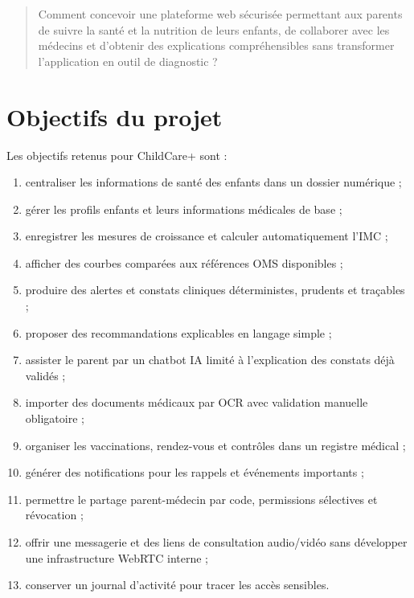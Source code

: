 \begin{quote}
Comment concevoir une plateforme web sécurisée permettant aux parents de suivre la santé et la nutrition de leurs enfants, de collaborer avec les médecins et d'obtenir des explications compréhensibles sans transformer l'application en outil de diagnostic ?
\end{quote}

\section{Objectifs du projet}
\label{sec:objectifs}

Les objectifs retenus pour ChildCare+ sont :

\begin{enumerate}
    \item centraliser les informations de santé des enfants dans un dossier numérique ;
    \item gérer les profils enfants et leurs informations médicales de base ;
    \item enregistrer les mesures de croissance et calculer automatiquement l'IMC ;
    \item afficher des courbes comparées aux références OMS disponibles ;
    \item produire des alertes et constats cliniques déterministes, prudents et traçables ;
    \item proposer des recommandations explicables en langage simple ;
    \item assister le parent par un chatbot IA limité à l'explication des constats déjà validés ;
    \item importer des documents médicaux par OCR avec validation manuelle obligatoire ;
    \item organiser les vaccinations, rendez-vous et contrôles dans un registre médical ;
    \item générer des notifications pour les rappels et événements importants ;
    \item permettre le partage parent-médecin par code, permissions sélectives et révocation ;
    \item offrir une messagerie et des liens de consultation audio/vidéo sans développer une infrastructure WebRTC interne ;
    \item conserver un journal d'activité pour tracer les accès sensibles.
\end{enumerate}


